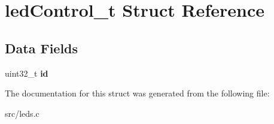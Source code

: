 \hypertarget{structledControl__t}{}\section{led\+Control\+\_\+t Struct Reference}
\label{structledControl__t}
\subsection*{Data Fields}
\begin{DoxyCompactItemize}
\item 
uint32\+\_\+t {\bfseries id}\hypertarget{structledControl__t_a65e79096711e153a8e3bde98f00728e6}{}\label{structledControl__t_a65e79096711e153a8e3bde98f00728e6}

\end{DoxyCompactItemize}


The documentation for this struct was generated from the following file\+:\begin{DoxyCompactItemize}
\item 
src/leds.\+c\end{DoxyCompactItemize}
